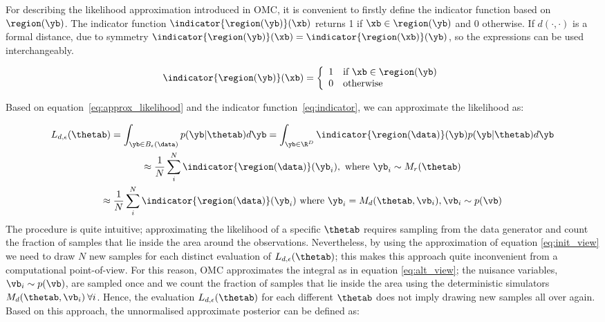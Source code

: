 For describing the likelihood approximation introduced in OMC, it is
convenient to firstly define the indicator function based on
$\region(\yb)$. The indicator function $\indicator{\region(\yb)}(\xb)$
returns 1 if $\xb \in \region(\yb)$ and 0 otherwise. If
$d(\cdot,\cdot)$ is a formal distance, due to symmetry
$\indicator{\region(\yb)}(\xb) = \indicator{\region(\xb)}(\yb)$, so
the expressions can be used interchangeably.

\begin{gather} \label{eq:indicator} \indicator{\region(\yb)}(\xb)=
  \left\{
    \begin{array}{ll}
      1 & \mbox{if } \xb \in \region(\yb) \\
      0 & \mbox{otherwise} 
    \end{array} \right. \end{gather}

\noindent
Based on equation~\eqref{eq:approx_likelihood} and the indicator
function~\eqref{eq:indicator}, we can approximate the likelihood as:

\begin{gather} \label{eq:approx_likelihood_omc}
  L_{d, \epsilon}(\thetab) =
  \int_{\yb \in B_\epsilon(\data)}p(\yb|\thetab)d\yb =
  \int_{\yb \in \R^D} \indicator{\region(\data)}(\yb)p(\yb|\thetab)d\yb\\
  \approx \frac{1}{N} \sum_i^N \indicator{\region(\data)}(\yb_i),\text{ where }
  \yb_i \sim M_r(\thetab) \label{eq:init_view}\\
  \approx \frac{1}{N} \sum_i^N \indicator{\region (\data)} (\yb_i)
  \text{ where } \yb_i = M_d(\thetab, \vb_i), \vb_i \sim p(\vb) \label{eq:alt_view}
\end{gather}
%
The procedure is quite intuitive; approximating the likelihood of a
specific $\thetab$ requires sampling from the data generator and count
the fraction of samples that lie inside the area around the
observations. Nevertheless, by using the approximation of equation
\eqref{eq:init_view} we need to draw $N$ new samples for each distinct
evaluation of $L_{d,\epsilon}(\thetab)$; this makes this approach
quite inconvenient from a computational point-of-view. For this
reason, OMC approximates the integral as in equation
\eqref{eq:alt_view}; the nuisance variables, $\vb_i \sim p(\vb)$, are
sampled once and we count the fraction of samples that lie inside the
area using the deterministic simulators
$M_d(\thetab, \vb_i) \: \forall i$. Hence, the evaluation
$L_{d,\epsilon}(\thetab)$ for each different $\thetab$ does not imply
drawing new samples all over again. Based on this approach, the
unnormalised approximate posterior can be defined as:

